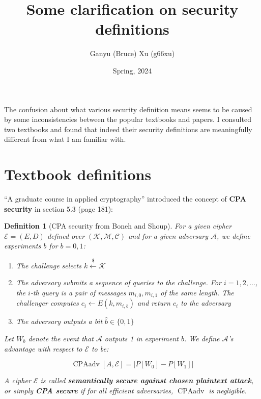 \documentclass{article}
\title{Some clarification on security definitions}
\author{Ganyu (Bruce) Xu (g66xu)}
\date{Spring, 2024}
\newcommand{\norm}[1]{\vert {#1} \vert}
\newcommand{\leftsample}{\overset{{\scriptscriptstyle\$}}{\leftarrow}}
\newtheorem{definition}{Definition}[section]
\begin{document}
\maketitle

The confusion about what various security definition means seems to be caused by some inconsistencies between the popular textbooks and papers. I consulted two textbooks and found that indeed their security definitions are meaningfully different from what I am familiar with.

\section{Textbook definitions}
``A graduate course in applied cryptography''\cite{boneh2020graduate} introduced the concept of \textbf{CPA security} in section 5.3 (page 181):

\begin{definition}[CPA security from Boneh and Shoup]
    For a given cipher $\mathcal{E} = (E, D)$ defined over $(\mathcal{K}, \mathcal{M}, \mathcal{C})$ and for a given adversary $\mathcal{A}$, we define experiments $b$ for $b = 0, 1$:

    \begin{enumerate}
        \item The challenge selects $k \leftsample \mathcal{K}$
        \item The adversary submits a sequence of queries to the challenge. For $i = 1, 2, \ldots$, the $i$-th query is a pair of messages $m_{i, 0}, m_{i, 1}$ of the same length. The challenger computes $c_i \leftarrow E(k, m_{i, b})$ and return $c_i$ to the adversary
        \item The adversary outputs a bit $\hat{b} \in \{0, 1\}$
    \end{enumerate}

    Let $W_b$ denote the event that $\mathcal{A}$ outputs 1 in experiment $b$. We define $\mathcal{A}$'s advantage with respect to $\mathcal{E}$ to be:

    \begin{equation*}
        \operatorname{CPAadv}[A, \mathcal{E}] = \norm{
            P[W_0] - P[W_1]
        }
    \end{equation*}

    A cipher $\mathcal{E}$ is called \textbf{semantically secure against chosen plaintext attack}, or simply \textbf{CPA secure} if for all efficient adversaries, $\operatorname{CPAadv}$ is negligible.
\end{definition}
\end{document}
